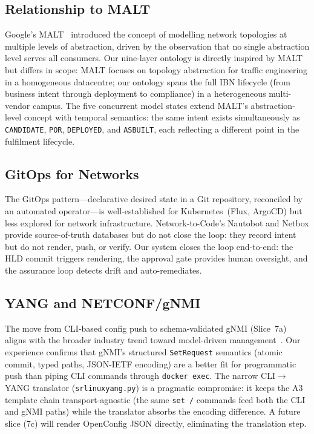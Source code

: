 \documentclass[acmtog]{acmart}
\renewcommand\_{\textunderscore\allowbreak}
\begin{document}
\subsection{Relationship to MALT}

Google's MALT~\cite{malt} introduced the concept of modelling
network topologies at multiple levels of abstraction, driven by
the observation that no single abstraction level serves all
consumers. Our nine-layer ontology is directly inspired by MALT
but differs in scope: MALT focuses on topology abstraction for
traffic engineering in a homogeneous datacentre; our ontology spans
the full IBN lifecycle (from business intent through deployment
to compliance) in a heterogeneous multi-vendor campus. The five
concurrent model states extend MALT's abstraction-level concept
with temporal semantics: the same intent exists simultaneously as
\texttt{CANDIDATE}, \texttt{POR}, \texttt{DEPLOYED}, and
\texttt{AS\_BUILT}, each reflecting a different point in the
fulfilment lifecycle.

\subsection{GitOps for Networks}

The GitOps pattern---declarative desired state in a Git repository,
reconciled by an automated operator---is well-established for
Kubernetes~(Flux, ArgoCD) but less explored for network
infrastructure. Network-to-Code's Nautobot and Netbox provide
source-of-truth databases but do not close the loop: they record
intent but do not render, push, or verify. Our system closes the
loop end-to-end: the HLD commit triggers rendering, the approval
gate provides human oversight, and the assurance loop detects
drift and auto-remediates.

\subsection{YANG and NETCONF/gNMI}

The move from CLI-based config push to schema-validated gNMI
(Slice~7a) aligns with the broader industry trend toward
model-driven management~\cite{gnmi}. Our experience confirms
that gNMI's structured \texttt{SetRequest} semantics (atomic
commit, typed paths, JSON-IETF encoding) are a better fit for
programmatic push than piping CLI commands through
\texttt{docker exec}. The narrow CLI$\rightarrow$YANG translator
(\texttt{\_srlinux\_yang.py}) is a pragmatic compromise: it keeps
the A3 template chain transport-agnostic (the same \texttt{set /}
commands feed both the CLI and gNMI paths) while the translator
absorbs the encoding difference. A future slice (7c) will render
OpenConfig JSON directly, eliminating the translation step.
\end{document}
